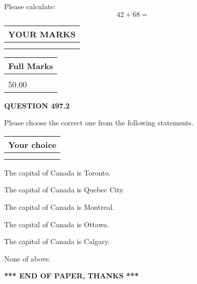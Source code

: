 \documentclass[12pt]{article}
\begin{document}
  
 
Please calculate:
\begin{equation}
42 +  %
68 = \nonumber
\end{equation}
 

 

 
  
\vspace{0.2in}
  
\noindent\begin{tabular}{|l|}
\hline
 YOUR MARKS  \\
\hline
 \\ 
 \\ 
\hline
\end{tabular}
\hspace{0.05in} \begin{tabular}{|l|}
\hline
 Full Marks  \\
\hline
 \\ 
50.00 \\
\hline
\end{tabular}
{\textbf{\Large{QUESTION
497.2 
}}}
  
  
Please choose the correct one from the following statements.
  
  
\noindent\hspace{3.0in} \begin{tabular}{|l|}
\hline
Your choice \\
\hline
 \\ 
 \\ 
\hline
\end{tabular}
  
  
 
 
The capital of Canada is Toronto.
 
 
The capital of Canada is Quebec City.
 
 
The capital of Canada is Montreal.
 
 
The capital of Canada is Ottawa.
 
 
The capital of Canada is Calgary.
 
 
 None of above.
 
 
   
   
 \vspace{0.2in}
 
   
   
   
   
\vspace{1.0in} 
{\textbf{\large{ *** END OF PAPER, THANKS *** }}} 
   
\end{document}
